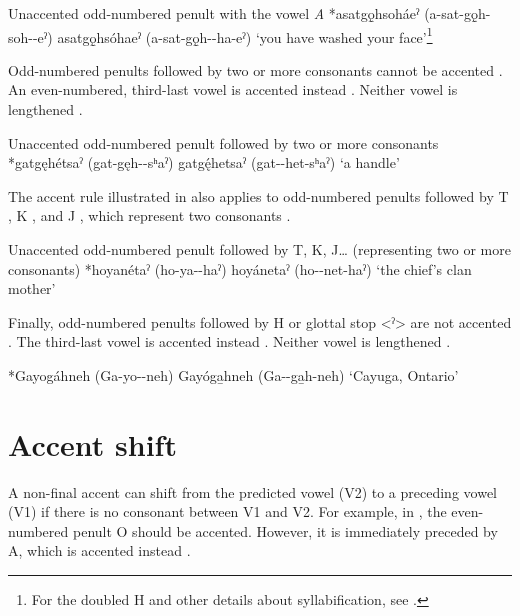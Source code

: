 \ea\label{ex:nonfinacex2} Unaccented odd-numbered penult with the vowel \textit{A}
\ea\label{ex:nonfinacex2a}  *asatgǫ̱hsoháeˀ (a-sat-gǫ̱h-soh--eˀ)
\ex\label{ex:nonfinacex2b}  asatgǫ̱hsóhaeˀ (a-sat-gǫ̱h--ha-eˀ) ‘you have washed your face’\footnote{For the doubled H and other details about syllabification, see .}
\z
\z 

Odd-numbered penults followed by two or more consonants cannot be accented . An even-numbered, third-last vowel is accented instead . Neither vowel is lengthened . 

\ea\label{ex:nonfinacex3} Unaccented odd-numbered penult followed by two or more consonants
\ea\label{ex:nonfinacex3a}  *gatgęhétsaˀ (gat-gęh--sʰaˀ)
\ex\label{ex:nonfinacex3b}  gatgę́hetsaˀ (gat--het-sʰaˀ) ‘a handle’ 
\z
\z

The accent rule illustrated in  also applies to odd-numbered penults followed by T , K , and J , which represent two consonants .

\ea\label{ex:nonfinacex4} Unaccented odd-numbered penult followed by T, K, J… (representing two or more consonants)
\ea {} *hoyanétaˀ (ho-ya--haˀ) 
\ex {} hoyánetaˀ (ho--net-haˀ) ‘the chief’s clan mother’
\z
\z 

Finally, odd-numbered penults followed by H or glottal stop <ˀ> are not accented . The third-last vowel is accented instead . Neither vowel is lengthened . 

\ea\label{ex:newnonfinacex1} 
\ea\label{ex:newnonfinacex1a}  *Gayogáhneh (Ga-yo--neh)
\ex\label{ex:newnonfinacex1b}  Gayóga̱hneh (Ga--ga̱h-neh) ‘Cayuga, Ontario’
\z 
\z

\section{Accent shift}
A non-final accent can shift from the predicted vowel (V2) to a preceding vowel (V1) if there is no consonant between V1 and V2. For example, in , the even-numbered penult O should be accented. However, it is immediately preceded by A, which is accented instead . 


